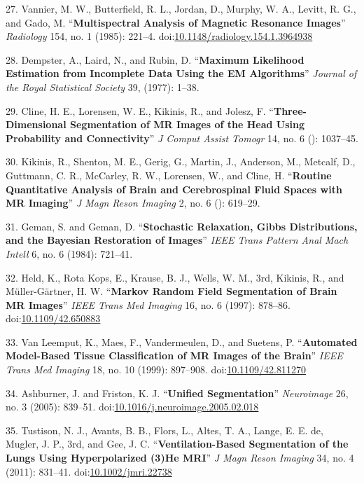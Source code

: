 \documentclass[11pt,]{article}
\begin{document}
27. Vannier, M. W., Butterfield, R. L., Jordan, D., Murphy, W. A.,
Levitt, R. G., and Gado, M. ``\textbf{Multispectral Analysis of Magnetic
Resonance Images}'' \emph{Radiology} 154, no. 1 (1985): 221--4.
doi:\href{http://dx.doi.org/10.1148/radiology.154.1.3964938}{10.1148/radiology.154.1.3964938}

28. Dempster, A., Laird, N., and Rubin, D. ``\textbf{Maximum Likelihood
Estimation from Incomplete Data Using the EM Algorithms}'' \emph{Journal
of the Royal Statistical Society} 39, (1977): 1--38.

29. Cline, H. E., Lorensen, W. E., Kikinis, R., and Jolesz, F.
``\textbf{Three-Dimensional Segmentation of MR Images of the Head Using
Probability and Connectivity}'' \emph{J Comput Assist Tomogr} 14, no. 6
(): 1037--45.

30. Kikinis, R., Shenton, M. E., Gerig, G., Martin, J., Anderson, M.,
Metcalf, D., Guttmann, C. R., McCarley, R. W., Lorensen, W., and Cline,
H. ``\textbf{Routine Quantitative Analysis of Brain and Cerebrospinal
Fluid Spaces with MR Imaging}'' \emph{J Magn Reson Imaging} 2, no. 6 ():
619--29.

31. Geman, S. and Geman, D. ``\textbf{Stochastic Relaxation, Gibbs
Distributions, and the Bayesian Restoration of Images}'' \emph{IEEE
Trans Pattern Anal Mach Intell} 6, no. 6 (1984): 721--41.

32. Held, K., Rota Kops, E., Krause, B. J., Wells, W. M., 3rd, Kikinis,
R., and M{ü}ller-G{ä}rtner, H. W. ``\textbf{Markov Random Field
Segmentation of Brain MR Images}'' \emph{IEEE Trans Med Imaging} 16, no.
6 (1997): 878--86.
doi:\href{http://dx.doi.org/10.1109/42.650883}{10.1109/42.650883}

33. Van Leemput, K., Maes, F., Vandermeulen, D., and Suetens, P.
``\textbf{Automated Model-Based Tissue Classification of MR Images of
the Brain}'' \emph{IEEE Trans Med Imaging} 18, no. 10 (1999): 897--908.
doi:\href{http://dx.doi.org/10.1109/42.811270}{10.1109/42.811270}

34. Ashburner, J. and Friston, K. J. ``\textbf{Unified Segmentation}''
\emph{Neuroimage} 26, no. 3 (2005): 839--51.
doi:\href{http://dx.doi.org/10.1016/j.neuroimage.2005.02.018}{10.1016/j.neuroimage.2005.02.018}

35. Tustison, N. J., Avants, B. B., Flors, L., Altes, T. A., Lange, E.
E. de, Mugler, J. P., 3rd, and Gee, J. C. ``\textbf{Ventilation-Based
Segmentation of the Lungs Using Hyperpolarized (3)He MRI}'' \emph{J Magn
Reson Imaging} 34, no. 4 (2011): 831--41.
doi:\href{http://dx.doi.org/10.1002/jmri.22738}{10.1002/jmri.22738}
\end{document}
